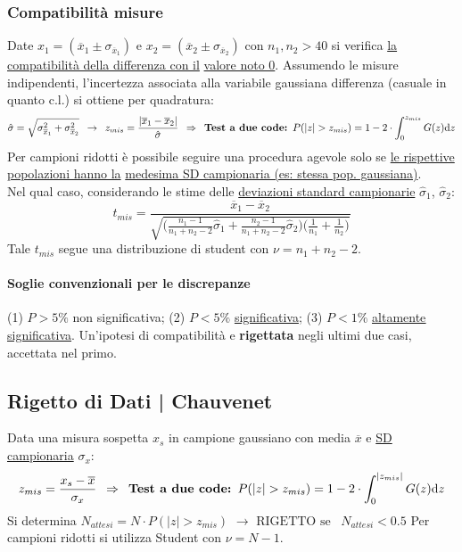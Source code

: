 \documentclass[11pt]{article}
\begin{document}
\subsubsection*{Compatibilità misure}
Date $x_1 = (\overline{x}_1 \pm \sigma_{\overline{x}_1})$ e $x_2 = (\overline{x}_2 \pm \sigma_{\overline{x}_2})$ con $n_1, n_2 > 40$ si verifica \underline{la compatibilità della differenza con il} \underline{valore noto 0}. Assumendo le misure indipendenti, l'incertezza associata alla variabile gaussiana differenza (casuale in quanto c.l.) si ottiene per quadratura:
\[\hat{\sigma} = \sqrt{\sigma_{\overline{x}_1}^2 + \sigma_{\overline{x}_2}^2} \enspace \rightarrow \enspace z_{mis} = \frac{|\overline{x}_1 - \overline{x}_2|}{\hat{\sigma}} \enspace \Rightarrow \enspace \textrm{\textbf{Test a due code: }} P(|z| > z_{mis}) = 1 - 2 \cdot \int_{0}^{z_{mis}} G(z) \textrm{d}z\]
Per campioni ridotti è possibile seguire una procedura agevole solo se \underline{le rispettive popolazioni hanno la} \underline{medesima SD campionaria (es: stessa pop. gaussiana)}.\\Nel qual caso, considerando le stime delle \underline{deviazioni standard campionarie} $\hat{\sigma}_1$, $\hat{\sigma}_2$:
\[t_{mis} = \frac{\overline{x}_1 - \overline{x}_2}{\sqrt{\bigg(\displaystyle \frac{n_1 - 1}{n_1 + n_2 - 2} \hat{\sigma}_1 + \frac{n_2 - 1}{n_1 + n_2 - 2} \hat{\sigma}_2 \bigg) \bigg( \displaystyle \frac{1}{n_1} + \frac{1}{n_2} \bigg)}}\]
Tale $t_{mis}$ segue una distribuzione di student con $\nu = n_1 + n_2 -2$.

\paragraph{Soglie convenzionali per le discrepanze} (1) $P > 5\%$ non significativa; (2) $P < 5\%$ \underline{significativa}; (3) $P < 1\%$ \underline{\underline{altamente significativa}}. Un'ipotesi di compatibilità e \textbf{rigettata} negli ultimi due casi, accettata nel primo.

\subsection{Rigetto di Dati | Chauvenet}
Data una misura sospetta $x_s$ in campione gaussiano con media $\overline{x}$ e \underline{SD campionaria} $\sigma_x$:
\[z_{mis} = \frac{x_s - \overline{x}}{\sigma_x} \enspace \Rightarrow \enspace \textrm{\textbf{Test a due code: }} P(|z| > z_{mis}) = 1 - 2 \cdot \int_{0}^{|z_{mis}|} G(z) \textrm{d}z\]
Si determina $N_{attesi} = N \cdot P(|z| > z_{mis})$ $\rightarrow$ $\boxed{\textrm{RIGETTO se }\enspace N_{attesi} < 0.5}$
Per campioni ridotti si utilizza Student con $\nu = N - 1$.
\end{document}
